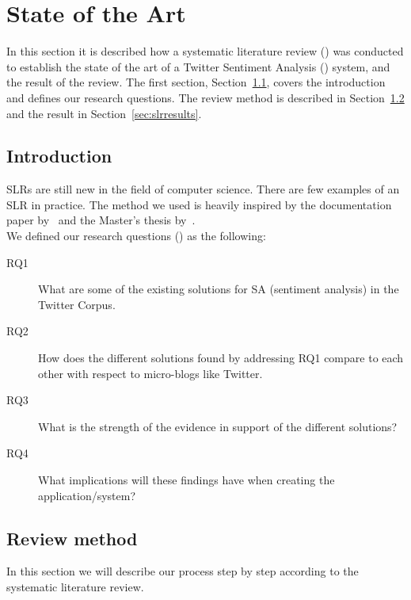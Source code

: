 \chapter{State of the Art}

In this section it is described how a systematic literature review () was conducted to establish the state of the art of a Twitter Sentiment Analysis () system, and the result of the review. The first section, Section~\ref{sec:slrintro}, covers the introduction and defines our research questions. The review method is described in Section~\ref{sec:slrmethod} and the result in Section~\ref{sec:slrresults}.

\section{Introduction}
\label{sec:slrintro}

SLRs are still new in the field of computer science. There are few examples of an SLR in practice. The method we used is heavily inspired by the documentation paper by~\cite{paper:slrdesc} and the Master's thesis by~\cite{master:slr}. \\

\noindent We defined our research questions () as the following:

\begin{description}

\item[RQ1] What are some of the existing solutions for SA (sentiment analysis) in the Twitter Corpus.
\item[RQ2] How does the different solutions found by addressing RQ1 compare to each other with respect to micro-blogs like Twitter.
\item[RQ3] What is the strength of the evidence in support of the different solutions?
\item[RQ4] What implications will these findings have when creating the application/system?

\end{description}

\section{Review method}
\label{sec:slrmethod}

In this section we will describe our process step by step according to the systematic literature review. 

